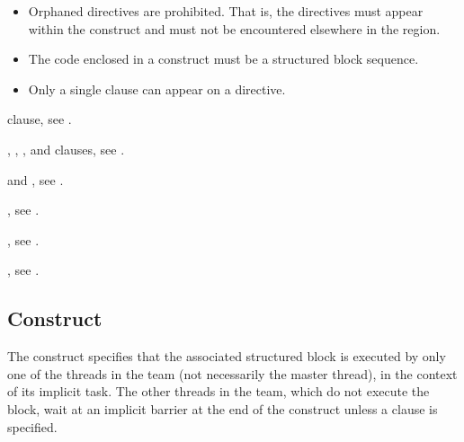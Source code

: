 \begin{itemize}
\item Orphaned  directives are prohibited. That is, the 
       directives must appear within the  
      construct and must not be encountered elsewhere in the  region.
\item The code enclosed in a  construct must be a structured block
      sequence.
\item Only a single  clause can appear on a  directive.

\end{itemize}

\begin{crossrefs}
\item {} clause, see
.

\item {}, , , and 
 clauses, see .

\item {} and , see
  .

\item {}, see .

\item {}, see
.

\item {}, see 
.

\end{crossrefs}



\subsection{ Construct}
\label{subsec:single Construct}
\summary
The  construct specifies that the associated structured block is 
executed by only one of the threads in the team (not necessarily the master 
thread), in the context of its implicit task. The other threads in the team, 
which do not execute the block, wait at an implicit barrier at the end of the 
 construct unless a  clause is specified.

